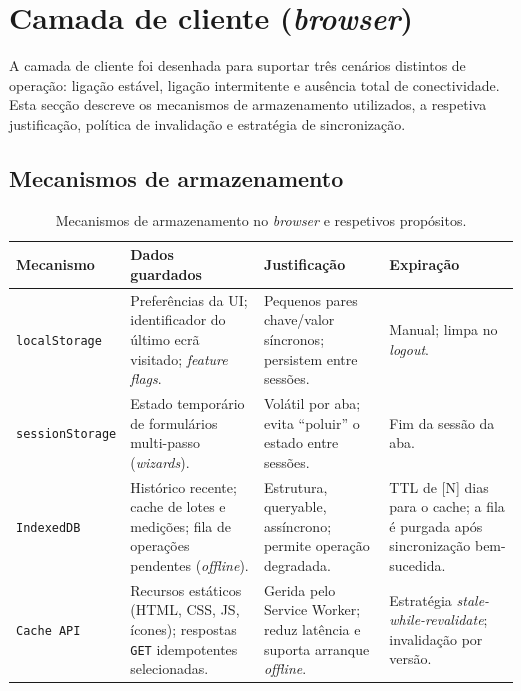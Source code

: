 \section{Camada de cliente (\emph{browser})}
\label{sec:camada-browser}


A camada de cliente foi desenhada para suportar três cenários
distintos de operação: ligação estável, ligação intermitente e
ausência total de conectividade. Esta secção descreve os
mecanismos de armazenamento utilizados, a respetiva justificação,
política de invalidação e estratégia de sincronização.

\subsection{Mecanismos de armazenamento}

\begin{table}[H]
\centering
\caption{Mecanismos de armazenamento no \emph{browser} e respetivos propósitos.}
\label{tab:browser-storage}
\footnotesize
\renewcommand{\arraystretch}{1.4}
\begin{tabularx}{\linewidth}{l X X X}
\toprule
\textbf{Mecanismo} & \textbf{Dados guardados} & \textbf{Justificação} & \textbf{Expiração} \\
\midrule
\texttt{localStorage} &
Preferências da UI; identificador do último ecrã visitado; \emph{feature flags}. &
Pequenos pares chave/valor síncronos; persistem entre sessões. &
Manual; limpa no \emph{logout}. \\

\texttt{sessionStorage} &
Estado temporário de formulários multi-passo (\emph{wizards}). &
Volátil por aba; evita ``poluir'' o estado entre sessões. &
Fim da sessão da aba. \\

\texttt{IndexedDB} &
Histórico recente; cache de lotes e medições; fila de operações pendentes (\emph{offline}). &
Estrutura, queryable, assíncrono; permite operação degradada. &
TTL de [N] dias para o cache; a fila é purgada após sincronização bem-sucedida. \\

\texttt{Cache API} &
Recursos estáticos (HTML, CSS, JS, ícones); respostas \texttt{GET} idempotentes selecionadas. &
Gerida pelo Service Worker; reduz latência e suporta arranque \emph{offline}. &
Estratégia \emph{stale-while-revalidate}; invalidação por versão. \\
\bottomrule
\end{tabularx}
\end{table}


